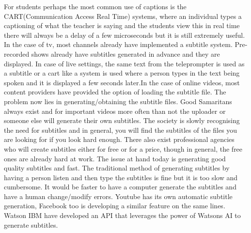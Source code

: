 \documentclass[sigconf]{acmart}
\begin{document}
For students perhaps the most common use of captions is the CART(Communication Access Real Time) systems, where an individual types a captioning of what the teacher is saying and the students view this in real time there will always be a delay of a few microseconds but it is still extremely useful. In the case of tv, most channels already have implemented a subtitle system. Pre-recorded shows already have subtitles generated in advance and they are displayed. In case of live settings, the same text from the teleprompter is used as a subtitle or a cart like a system is used where a person types in the text being spoken and it is displayed a few seconds later.In the case of online videos, most content providers have provided the option of loading the subtitle file. The problem now lies in generating/obtaining the subtitle files. Good Samaritans always exist and for important videos more often than not the uploader or someone else will generate their own subtitles. The society is slowly recognising the need for subtitles and in general, you will find the subtitles of the files you are looking for if you look hard enough. There also exist professional agencies who will create subtitles either for free or for a price, though in general, the free ones are already hard at work. 
\newline
The issue at hand today is generating good quality subtitles and fast. The traditional method of generating subtitles by having a person listen and then type the subtitles is fine but it is too slow and cumbersome. It would be faster to have a computer generate the subtitles and have a human change/modify errors. Youtube has its own automatic subtitle generation, Facebook too is developing a similar feature on the same lines. Watson IBM have developed an API that leverages the power of Watsons AI to generate subtitles.
\end{document}
